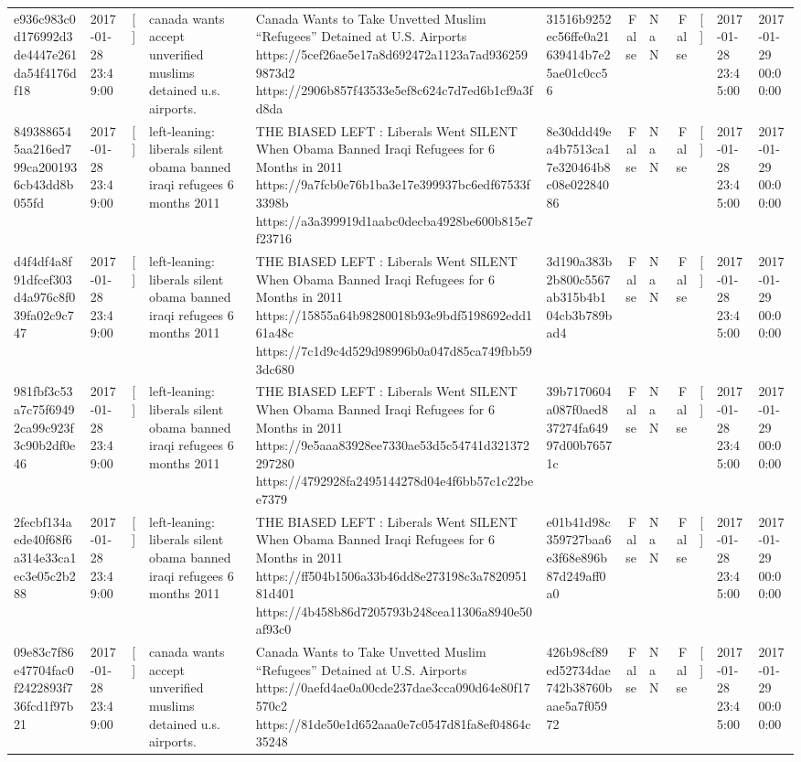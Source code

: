 \begin{tabular}{llllllrlrlll}
e936c983c0d176992d3de4447e261da54f4176df18 & 2017-01-28 23:49:00 & [] & canada wants accept unverified muslims detained u.s. airports. & Canada Wants to Take Unvetted Muslim “Refugees” Detained at U.S. Airports https://5cef26ae5e17a8d692472a1123a7ad9362599873d2 https://2906b857f43533e5ef8c624c7d7ed6b1cf9a3fd8da & 31516b9252ec56ffe0a21639414b7e25ae01c0cc56 & False & NaN & False & [] & 2017-01-28 23:45:00 & 2017-01-29 00:00:00 \\
8493886545aa216ed799ca2001936cb43dd8b055fd & 2017-01-28 23:49:00 & [] & left-leaning: liberals silent obama banned iraqi refugees 6 months 2011 & THE BIASED LEFT : Liberals Went SILENT When Obama Banned Iraqi Refugees for 6 Months in 2011 https://9a7fcb0e76b1ba3e17e399937bc6edf67533f3398b https://a3a399919d1aabc0decba4928be600b815e7f23716 & 8e30ddd49ea4b7513ca17e320464b8c08e02284086 & False & NaN & False & [] & 2017-01-28 23:45:00 & 2017-01-29 00:00:00 \\
d4f4df4a8f91dfcef303d4a976c8f039fa02c9c747 & 2017-01-28 23:49:00 & [] & left-leaning: liberals silent obama banned iraqi refugees 6 months 2011 & THE BIASED LEFT : Liberals Went SILENT When Obama Banned Iraqi Refugees for 6 Months in 2011 https://15855a64b98280018b93e9bdf5198692edd161a48c https://7c1d9c4d529d98996b0a047d85ca749fbb593dc680 & 3d190a383b2b800c5567ab315b4b104cb3b789bad4 & False & NaN & False & [] & 2017-01-28 23:45:00 & 2017-01-29 00:00:00 \\
981fbf3c53a7c75f69492ca99c923f3c90b2df0e46 & 2017-01-28 23:49:00 & [] & left-leaning: liberals silent obama banned iraqi refugees 6 months 2011 & THE BIASED LEFT : Liberals Went SILENT When Obama Banned Iraqi Refugees for 6 Months in 2011 https://9e5aaa83928ee7330ae53d5c54741d321372297280 https://4792928fa2495144278d04e4f6bb57c1c22bee7379 & 39b7170604a087f0aed837274fa64997d00b76571c & False & NaN & False & [] & 2017-01-28 23:45:00 & 2017-01-29 00:00:00 \\
2fecbf134aede40f68f6a314e33ca1ec3e05c2b288 & 2017-01-28 23:49:00 & [] & left-leaning: liberals silent obama banned iraqi refugees 6 months 2011 & THE BIASED LEFT : Liberals Went SILENT When Obama Banned Iraqi Refugees for 6 Months in 2011 https://ff504b1506a33b46dd8e273198c3a782095181d401 https://4b458b86d7205793b248cea11306a8940e50af93c0 & e01b41d98c359727baa6e3f68e896b87d249aff0a0 & False & NaN & False & [] & 2017-01-28 23:45:00 & 2017-01-29 00:00:00 \\
09e83c7f86e47704fac0f2422893f736fcd1f97b21 & 2017-01-28 23:49:00 & [] & canada wants accept unverified muslims detained u.s. airports. & Canada Wants to Take Unvetted Muslim “Refugees” Detained at U.S. Airports https://0aefd4ae0a00cde237dae3cca090d64e80f17570c2 https://81de50e1d652aaa0e7c0547d81fa8ef04864c35248 & 426b98cf89ed52734dae742b38760baae5a7f05972 & False & NaN & False & [] & 2017-01-28 23:45:00 & 2017-01-29 00:00:00 \\

\end{tabular}

